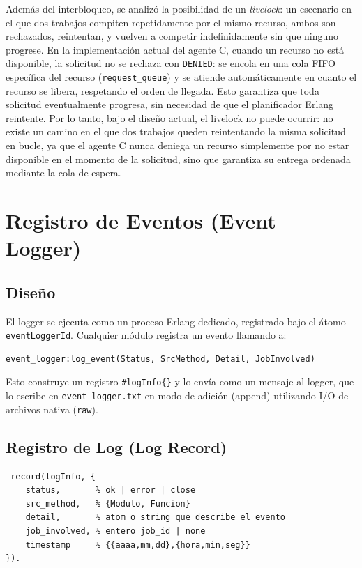 \documentclass[12pt,a4paper]{article}
\begin{document}
Además del interbloqueo, se analizó la posibilidad de un \emph{livelock}: un escenario en el que dos trabajos compiten repetidamente por el mismo recurso, ambos son rechazados, reintentan, y vuelven a competir indefinidamente sin que ninguno progrese. En la implementación actual del agente C, cuando un recurso no está disponible, la solicitud no se rechaza con \texttt{DENIED}: se encola en una cola FIFO específica del recurso (\texttt{request\_queue}) y se atiende automáticamente en cuanto el recurso se libera, respetando el orden de llegada. Esto garantiza que toda solicitud eventualmente progresa, sin necesidad de que el planificador Erlang reintente. Por lo tanto, bajo el diseño actual, el livelock no puede ocurrir: no existe un camino en el que dos trabajos queden reintentando la misma solicitud en bucle, ya que el agente C nunca deniega un recurso simplemente por no estar disponible en el momento de la solicitud, sino que garantiza su entrega ordenada mediante la cola de espera.

\section{Registro de Eventos (Event Logger)}

\subsection{Diseño}

El logger se ejecuta como un proceso Erlang dedicado, registrado bajo el átomo \texttt{eventLoggerId}. Cualquier módulo registra un evento llamando a:

\begin{lstlisting}
event_logger:log_event(Status, SrcMethod, Detail, JobInvolved)
\end{lstlisting}

Esto construye un registro \texttt{\#logInfo\{\}} y lo envía como un mensaje al logger, que lo escribe en \texttt{event\_logger.txt} en modo de adición (append) utilizando I/O de archivos nativa (\texttt{raw}).

\subsection{Registro de Log (Log Record)}

\begin{lstlisting}
-record(logInfo, {
    status,       % ok | error | close
    src_method,   % {Modulo, Funcion}
    detail,       % atom o string que describe el evento
    job_involved, % entero job_id | none
    timestamp     % {{aaaa,mm,dd},{hora,min,seg}}
}).
\end{lstlisting}
\end{document}
